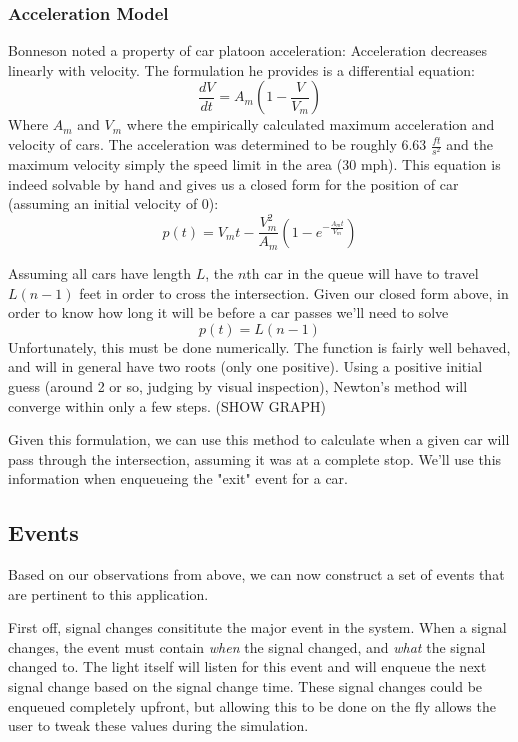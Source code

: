 \documentclass[a4paper,12pt]{article}
\begin{document}
\subsubsection{Acceleration Model}
Bonneson \cite{bonneson} noted a property of car platoon acceleration: Acceleration decreases linearly with velocity.
The formulation he provides is a differential equation:
\[
\frac{dV}{dt} = A_{m} \left( 1 - \frac{V}{V_{m}} \right)
\]
Where $A_m$ and $V_m$ where the empirically calculated maximum acceleration and velocity of cars. The acceleration was
determined to be roughly 6.63 $\frac{ft}{s^2}$ and the maximum velocity simply the speed limit in the area (30 mph).
This equation is indeed solvable by hand and gives us a closed form for the position of car (assuming an initial velocity of 0):
\[
    p(t) = V_{m}t - \frac{V_{m}^2}{A_{m}} \left( 1 - e^{-\frac{A_{m}t}{V_{m}} } \right)
\]

Assuming all cars have length $L$, the $n$th car in the queue will have to travel $L(n-1)$ feet in order to cross the
intersection. Given our closed form above, in order to know how long it will be before a car passes we'll need to solve
\[
p(t) = L(n-1)
\]
Unfortunately, this must be done numerically. The function is fairly well behaved, and will in general have two roots
(only one positive). Using a positive initial guess (around 2 or so, judging by visual inspection), Newton's method will converge
within only a few steps. (SHOW GRAPH)

Given this formulation, we can use this method to calculate when a given car will pass through the intersection,
assuming it was at a complete stop. We'll use this information when enqueueing the "exit" event for a car.

\subsection{Events}
Based on our observations from above, we can now construct a set of events that are pertinent to this application.

First off, signal changes consititute the major event in the system. When a signal changes, the event must contain
\emph{when} the signal changed, and \emph{what} the signal changed to. The light itself will listen for this event
and will enqueue the next signal change based on the signal change time. These signal changes could be enqueued
completely upfront, but allowing this to be done on the fly allows the user to tweak these values during the simulation.
\end{document}

